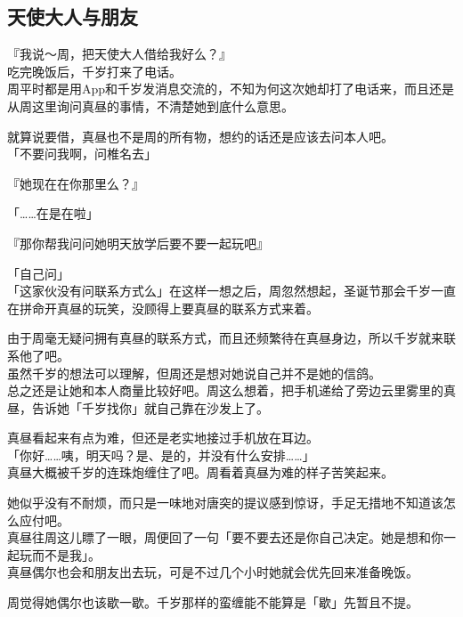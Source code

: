 \subsection{天使大人与朋友}

『我说～周，把天使大人借给我好么？』\\

吃完晚饭后，千岁打来了电话。\\

周平时都是用App和千岁发消息交流的，不知为何这次她却打了电话来，而且还是从周这里询问真昼的事情，不清楚她到底什么意思。

就算说要借，真昼也不是周的所有物，想约的话还是应该去问本人吧。\\

「不要问我啊，问椎名去」

『她现在在你那里么？』

「……在是在啦」

『那你帮我问问她明天放学后要不要一起玩吧』

「自己问」\\

「这家伙没有问联系方式么」在这样一想之后，周忽然想起，圣诞节那会千岁一直在拼命开真昼的玩笑，没顾得上要真昼的联系方式来着。

由于周毫无疑问拥有真昼的联系方式，而且还频繁待在真昼身边，所以千岁就来联系他了吧。\\

虽然千岁的想法可以理解，但周还是想对她说自己并不是她的信鸽。\\

总之还是让她和本人商量比较好吧。周这么想着，把手机递给了旁边云里雾里的真昼，告诉她「千岁找你」就自己靠在沙发上了。

真昼看起来有点为难，但还是老实地接过手机放在耳边。\\

「你好……咦，明天吗？是、是的，并没有什么安排……」\\

真昼大概被千岁的连珠炮缠住了吧。周看着真昼为难的样子苦笑起来。

她似乎没有不耐烦，而只是一味地对唐突的提议感到惊讶，手足无措地不知道该怎么应付吧。\\

真昼往周这儿瞟了一眼，周便回了一句「要不要去还是你自己决定。她是想和你一起玩而不是我」。\\

真昼偶尔也会和朋友出去玩，可是不过几个小时她就会优先回来准备晚饭。

周觉得她偶尔也该歇一歇。千岁那样的蛮缠能不能算是「歇」先暂且不提。\\

